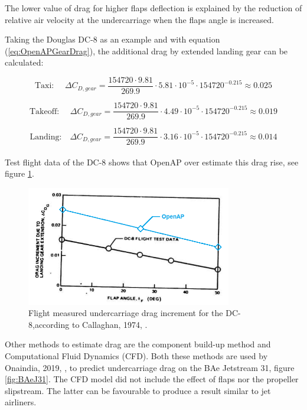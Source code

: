 \documentclass[english]{kththesis}
\begin{document}
The lower value of drag for higher flaps deflection is explained by the reduction of relative air velocity at the undercarriage when the flaps angle is increased.

Taking the Douglas DC-8 as an example and with equation (\ref{eq:OpenAPGearDrag}), the additional drag by extended landing gear can be calculated:

$$ \text{Taxi:       } \quad  \Delta C_{D,gear} = \frac{154720 \cdot 9.81}{269.9} \cdot 5.81 \cdot 10^{-5} \cdot  154720^{-0.215} \approx 0.025$$

$$ \text{Takeoff:  } \quad  \Delta C_{D,gear} = \frac{154720 \cdot 9.81}{269.9} \cdot 4.49 \cdot 10^{-5} \cdot  154720^{-0.215} \approx 0.019$$

$$ \text{Landing:} \quad  \Delta C_{D,gear} = \frac{154720 \cdot 9.81}{269.9} \cdot 3.16 \cdot 10^{-5} \cdot  154720^{-0.215} \approx 0.014$$\\

Test flight data of the DC-8 shows that OpenAP over estimate this drag rise, see figure \ref{fig:DC8Measured}.

\begin{figure}[hb]
    \centering
    \includegraphics[width=0.8\textwidth]{Epictures/DC-8 FlightMeasuredLandingGearDragIncrementVsFlapsAngle.png}
    \caption{Flight measured undercarriage drag increment for the DC-8,according to Callaghan, 1974, \cite{Callaghan1974}.}
    \label{fig:DC8Measured}
\end{figure}

\clearpage

Other methods to estimate drag are the component build-up method and Computational Fluid Dynamics (CFD). Both these methods are used by Onaindia, 2019, \cite{Onaindia2019}, to predict undercarriage drag on the BAe Jetstream 31, figure \ref{fig:BAeJ31}. The CFD model did not include the effect of flaps nor the propeller slipstream. The latter can be favourable to produce a result similar to jet airliners.
\end{document}
